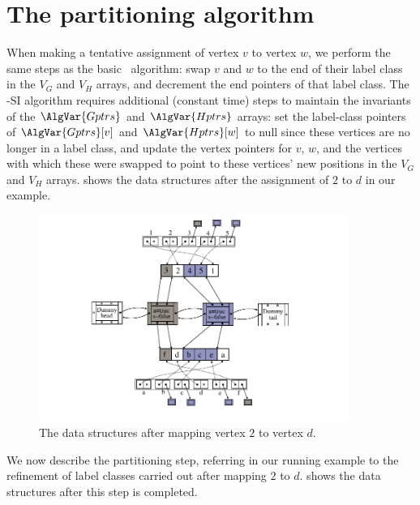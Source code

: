 \section{The partitioning algorithm}

When making a tentative assignment of vertex $v$ to vertex $w$, we perform the same steps
as the basic \McSplit\ algorithm: swap $v$ and $w$ to the
end of their label class in the $V_G$ and $V_H$ arrays, and decrement the end pointers
of that label class.  The \McSplit-SI algorithm requires additional (constant time)
steps to maintain the invariants of
the $\AlgVar{Gptrs}$ and $\AlgVar{Hptrs}$ arrays: set the label-class pointers of
$\AlgVar{Gptrs}[v]$ and $\AlgVar{Hptrs}[w]$ to null since these vertices
are no longer in a label class, and update the vertex pointers
for $v$, $w$, and the vertices with which these were swapped to point to these
vertices' new positions in the $V_G$ and $V_H$ arrays.
 shows the data structures after the assignment
of $2$ to $d$ in our example.

\FloatBarrier

\begin{figure}[h!]
    \centering
    \includegraphics*[width=0.9\textwidth]{14b-mcsplit-induced-si/figs/data-structure-step-2}
    \caption{The data structures after mapping vertex $2$ to vertex $d$.}
    \label{figure:si-data-structures-2}
\end{figure}

\FloatBarrier

We now describe the partitioning step, referring in our running example to
the refinement of label classes carried out after mapping $2$ to $d$.
 shows the data structures after this step is completed.

